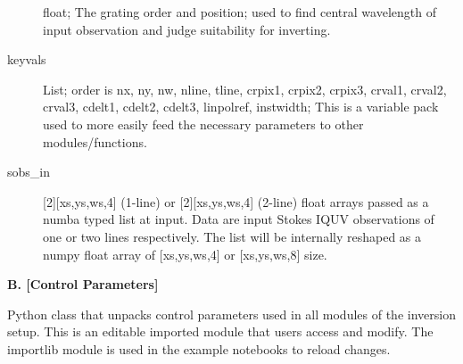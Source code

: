 \documentclass{article}
\begin{document}
\begin{description}
    		float; The grating order and position; used to find central wavelength of input observation and judge suitability for inverting.   
    	\item[keyvals]
    		List; order is nx, ny, nw, nline, tline, crpix1, crpix2, crpix3, crval1, crval2, crval3, cdelt1, cdelt2, cdelt3, linpolref, instwidth;  This is a variable pack used to more easily feed the necessary parameters to other modules/functions.                        
    \item[sobs\_in]
         [2][xs,ys,ws,4] (1-line) or [2][xs,ys,ws,4] (2-line) float arrays passed as a numba typed list at input. Data are input Stokes IQUV observations of one or two lines respectively. The list will be internally reshaped as a numpy float array of [xs,ys,ws,4] or [xs,ys,ws,8] size.  
\end{description}

\textbf{B. [Control Parameters]}

Python class that unpacks control parameters used in all modules of the inversion setup. This is an editable imported module that users access and modify. The importlib module is used in the example notebooks to reload changes.
\end{document}

